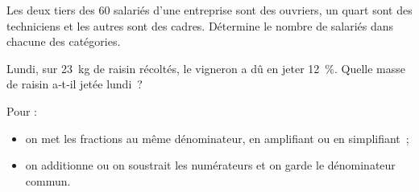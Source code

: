 \begin{methode*1}
  \exercice
Les deux tiers des 60 salariés d'une entreprise sont des ouvriers, un quart sont des techniciens et les autres sont des cadres. Détermine le nombre de salariés dans chacune des catégories.

  \exercice
Lundi, sur 23 kg de raisin récoltés, le vigneron a dû en jeter 12 \%. Quelle masse de raisin a‑t‑il jetée lundi ?

 \end{methode*1}



\begin{aconnaitre}
Pour  :
\begin{itemize}
 \item on met les fractions au même dénominateur, en amplifiant ou en simplifiant ; 
 \item on additionne ou on soustrait les numérateurs et on garde le dénominateur commun.
 \end{itemize}
\end{aconnaitre}


